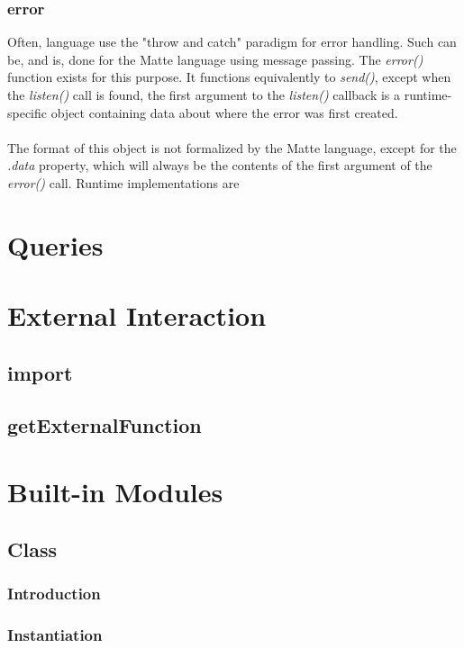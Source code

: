 \documentclass[12pt,letterpaper]{report}
\begin{document}
\subsection{error}\label{error}

Often, language use the "throw and catch" paradigm for error handling. Such can be, and is, done 
for the Matte language using message passing. The \textit{error()} function exists for this purpose. It functions 
equivalently to \textit{send()}, except when the \textit{listen()} call is found, the first argument 
to the \textit{listen()} callback is a runtime-specific object containing data about where the error 
was first created. 
\\\\
The format of this object is not formalized by the Matte language, except for the 
\textit{.data} property, which will always be the contents of the first argument 
of the \textit{error()} call. Runtime implementations are 

\chapter{Queries}\label{Queries}
\chapter{External Interaction}\label{External Interaction}
\section{import}\label{import}
\section{getExternalFunction}\label{getExternalFunction}
\chapter{Built-in Modules}\label{Built-in Modules}
\section{Class}\label{Class}
\subsection{Introduction}\label{Introduction}
\subsection{Instantiation}\label{Instantiation}
\end{document}
